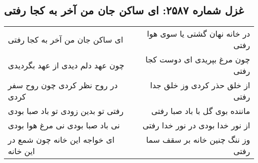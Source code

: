\begin{center}
\section*{غزل شماره ۲۵۸۷: ای ساکن جان من آخر به کجا رفتی}
\label{sec:2587}
\begin{longtable}{l p{0.5cm} r}
ای ساکن جان من آخر به کجا رفتی
&&
در خانه نهان گشتی یا سوی هوا رفتی
\\
چون عهد دلم دیدی از عهد بگردیدی
&&
چون مرغ بپریدی ای دوست کجا رفتی
\\
در روح نظر کردی چون روح سفر کردی
&&
از خلق حذر کردی وز خلق جدا رفتی
\\
رفتی تو بدین زودی تو باد صبا بودی
&&
ماننده بوی گل با باد صبا رفتی
\\
نی باد صبا بودی نی مرغ هوا بودی
&&
از نور خدا بودی در نور خدا رفتی
\\
ای خواجه این خانه چون شمع در این خانه
&&
وز ننگ چنین خانه بر سقف سما رفتی
\\
\end{longtable}
\end{center}
